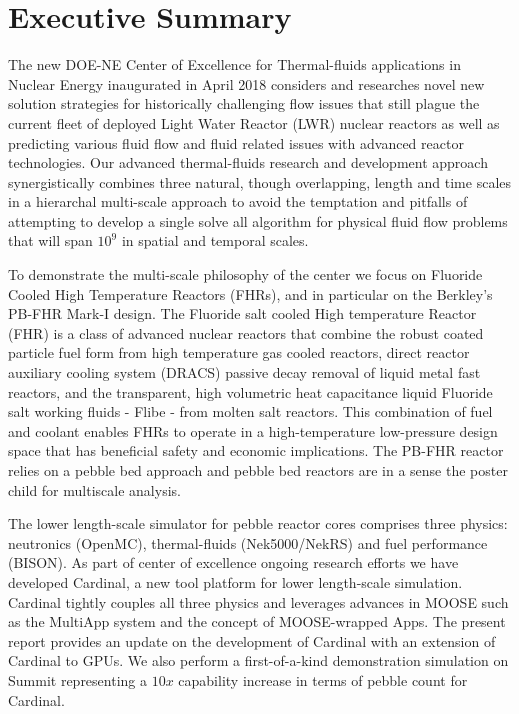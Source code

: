 
\section*{Executive Summary}

The new DOE-NE Center of Excellence for Thermal-fluids applications in Nuclear Energy inaugurated in
April 2018 considers and researches novel new solution strategies for historically challenging
flow issues that still plague the current  fleet of deployed Light Water Reactor (LWR) nuclear reactors as well as predicting various fluid flow and  fluid related issues with advanced reactor technologies. Our advanced thermal-fluids research and development approach synergistically combines three natural, though overlapping, length and time scales in a hierarchal multi-scale approach to avoid the temptation and pitfalls of attempting to develop a single solve all algorithm for physical  fluid flow problems that will span $10^9$ in spatial and temporal scales.

To demonstrate the multi-scale philosophy of the center we focus on Fluoride Cooled High
Temperature Reactors (FHRs), and in particular on the Berkley's PB-FHR Mark-I design. The
Fluoride salt cooled High temperature Reactor (FHR) is a class of advanced nuclear reactors that combine the
robust coated particle fuel form from high temperature gas cooled reactors, direct reactor auxiliary cooling
system (DRACS) passive decay removal of liquid metal fast reactors, and the transparent, high volumetric heat capacitance liquid Fluoride salt working fluids - Flibe - from molten salt reactors. This combination of fuel and coolant enables FHRs to operate in a high-temperature low-pressure design space that has beneficial safety and economic implications. The PB-FHR reactor relies on a pebble bed approach and pebble bed reactors are in a sense the poster child for multiscale analysis.

The lower length-scale simulator for pebble reactor cores comprises three physics: neutronics (OpenMC),
thermal-fluids (Nek5000/NekRS) and fuel performance (BISON). As part of center of excellence ongoing research efforts we have developed Cardinal, a new tool platform for lower length-scale simulation. Cardinal tightly couples all three physics and leverages advances in MOOSE such as the MultiApp system and the concept of MOOSE-wrapped Apps. The present report provides an update on the development of Cardinal with an extension of Cardinal to GPUs. We also perform a first-of-a-kind demonstration simulation on Summit representing a $10x$ capability increase in terms of pebble count for Cardinal.
